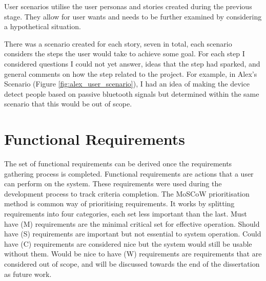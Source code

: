 \documentclass{l4proj}
\begin{document}
User scenarios utilise the user personas and stories created during the previous stage. They allow for user wants and needs to be further examined by considering a hypothetical situation.

There was a scenario created for each story, seven in total, each scenario considers the steps the user would take to achieve some goal. For each step I considered questions I could not yet answer, ideas that the step had sparked, and general comments on how the step related to the project. For example, in Alex's Scenario (Figure \ref{fig:alex_user_scenario}), I had an idea of making the device detect people based on passive bluetooth signals but determined within the same scenario that this would be out of scope.

\section{Functional Requirements} \label{sec:func_requirements}

The set of functional requirements can be derived once the requirements gathering process is completed. Functional requirements are actions that a user can perform on the system. These requirements were used during the development process to track criteria completion. The MoSCoW prioritisation method \citep{hudaib_requirements_2018} is common way of prioritising requirements. It works by splitting requirements into four categories, each set less important than the last. Must have (M) requirements are the minimal critical set for effective operation. Should have (S) requirements are important but not essential to system operation. Could have (C) requirements are considered nice but the system would still be usable without them. Would be nice to have (W) requirements are requirements that are considered out of scope, and will be discussed towards the end of the dissertation as future work.
\end{document}
